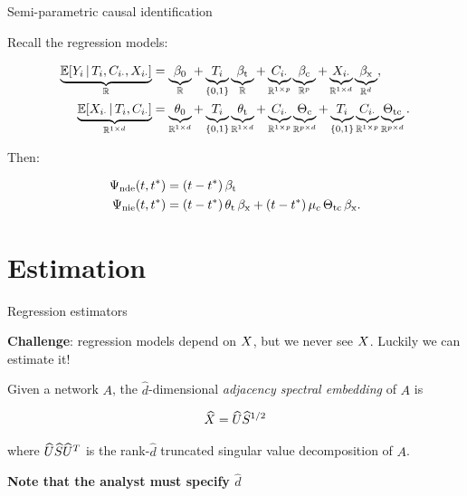 \documentclass{beamer}
\theoremstyle{remark}
\begin{document}
\begin{frame}{Semi-parametric causal identification}

    Recall the regression models:

    \begin{equation*}
        \begin{aligned}
            \underbrace{\E[T_i, \C_{i \cdot}, \X_{i \cdot}]{Y_i}}_{\R}
             & = \underbrace{\betazero}_{\R}
            + \underbrace{T_i}_{\{0, 1\}} \underbrace{\betat}_{\R}
            + \underbrace{\C_{i \cdot}}_{\R^{1 \times p}} \underbrace{\betac}_{\R^{p}}
            + \underbrace{\X_{i \cdot}}_{\R^{1 \times d}} \underbrace{\betax}_{\R^d}, \\
            \underbrace{\E[T_i, \C_{i \cdot}]{\X_{i \cdot}}}_{\R^{1 \times d}}
             & = \underbrace{\thetazero}_{\R^{1 \times d}}
            + \underbrace{T_i}_{\{0, 1\}} \underbrace{\thetat}_{\R^{1 \times d}}
            + \underbrace{\C_{i \cdot}}_{\R^{1 \times p}} \underbrace{\Thetac}_{\R^{p \times d}}
            + \underbrace{T_i}_{\{0, 1\}} \underbrace{\C_{i \cdot}}_{\R^{1 \times p}} \underbrace{\Thetatc}_{\R^{p \times d}}.
        \end{aligned}
    \end{equation*}

    Then:

    \begin{align*}
        \ndef & = \paren*{t - t^*} \, \betat                                                        \\
        \nief & = \paren*{t - t^*} \, \thetat \, \betax + (t - t^*) \, \mu_c \, \Thetatc \, \betax.
    \end{align*}

\end{frame}

\section{Estimation}

\begin{frame}{Regression estimators}

    \textbf{Challenge}: regression models depend on $X$, but we never see $X$. Luckily we can estimate it!

    \begin{definition}[ASE]

        Given a network $A$, the $\widehat{d}$-dimensional \emph{adjacency spectral embedding} of $A$ is

        \begin{align*}
            \widehat{X} = \widehat{U} \widehat{S}^{1/2}
        \end{align*}

        \noindent where $\widehat{U} \widehat{S} \widehat{U}^T$ is the rank-$\widehat{d}$ truncated singular value decomposition of $A$.

    \end{definition}

    \textbf{Note that the analyst must specify $\widehat{d}$}

\end{frame}
\end{document}
